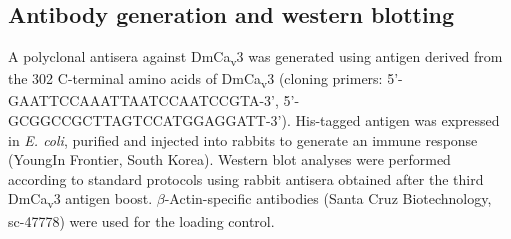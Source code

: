 \subsection*{Antibody generation and western blotting}

A polyclonal antisera against DmCa\textsubscript{v}3 was generated using antigen derived from the 302 C-terminal amino acids of DmCa\textsubscript{v}3 (cloning primers: 5'-GAATTCCAAATTAATCCAATCCGTA-3', 5'-GCGGCCGCTTAGTCCATGGAGGATT-3').
His-tagged antigen was expressed in \emph{E. coli}, purified and injected into rabbits to generate an immune response (YoungIn Frontier, South Korea).
Western blot analyses were performed according to standard protocols using rabbit antisera obtained after the third DmCa\textsubscript{v}3 antigen boost.
$\beta$-Actin-specific antibodies (Santa Cruz Biotechnology, sc-47778) were used for the loading control.